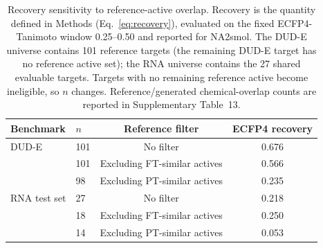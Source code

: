 \begin{table}[!htbp]
\centering
\footnotesize
\setlength{\tabcolsep}{7pt}
\begin{tabular}{@{}llcc@{}}
\toprule
\textbf{Benchmark} & \textbf{$n$} & \textbf{Reference filter} & \textbf{ECFP4 recovery} \\
\midrule
DUD-E          & 101 & No filter                       & 0.676 \\
               & 101 & Excluding FT-similar actives    & 0.566 \\
               & 98  & Excluding PT-similar actives    & 0.235 \\
RNA test set   & 27  & No filter                       & 0.218 \\
               & 18  & Excluding FT-similar actives    & 0.250 \\
               & 14  & Excluding PT-similar actives    & 0.053 \\
\bottomrule
\end{tabular}

\caption{Recovery sensitivity to reference-active overlap. Recovery is the quantity defined in
Methods (Eq.~\ref{eq:recovery}), evaluated on the fixed ECFP4-Tanimoto window 0.25--0.50 and
reported for NA2smol. The DUD-E universe contains 101 reference targets (the remaining DUD-E
target has no reference active set); the RNA universe contains the 27 shared evaluable targets.
Targets with no remaining reference active become ineligible, so $n$ changes. Reference/generated
chemical-overlap counts are reported in Supplementary Table~13.}
\label{overlap_table}
\end{table}

